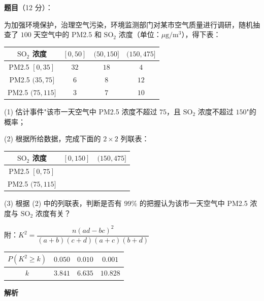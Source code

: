 \begin{answer}

\textbf{题目}（12 分）：

为加强环境保护，治理空气污染，环境监测部门对某市空气质量进行调研，随机抽查了 $100$ 天空气中的 PM2.5 和 $\mathrm{SO_2}$ 浓度（单位：$\mu\mathrm g/\mathrm m^{3}$），得下表：

\begin{center}
\begin{tabular}{cccc}
\toprule
$\mathrm{SO_2}$ 浓度 & $[0,50]$ & $(50,150]$ & $(150,475]$ \\
\midrule
PM2.5 $[0,35]$ & $32$ & $18$ & $4$ \\
PM2.5 $(35,75]$ & $6$ & $8$ & $12$ \\
PM2.5 $(75,115]$ & $3$ & $7$ & $10$ \\
\bottomrule
\end{tabular}
\end{center}

  (1) 估计事件"该市一天空气中 PM2.5 浓度不超过 $75$，且 $\mathrm{SO_2}$ 浓度不超过 $150$"的概率；

  (2) 根据所给数据，完成下面的 $2\times2$ 列联表：

\begin{center}
\begin{tabular}{ccc}
\toprule
$\mathrm{SO_2}$ 浓度 & $[0,150]$ & $(150,475]$ \\
\midrule
PM2.5 $[0,75]$ &  &  \\
PM2.5 $(75,115]$ &  &  \\
\bottomrule
\end{tabular}
\end{center}

  (3) 根据 (2) 中的列联表，判断是否有 $99\%$ 的把握认为该市一天空气中 PM2.5 浓度与 $\mathrm{SO_2}$ 浓度有关？

  附：$K^{2}=\dfrac{n(ad-bc)^{2}}{(a+b)(c+d)(a+c)(b+d)}$

\begin{center}
\begin{tabular}{cccc}
\toprule
$P\left(K^{2}\ge k\right)$ & $0.050$ & $0.010$ & $0.001$ \\
\midrule
$k$ & $3.841$ & $6.635$ & $10.828$ \\
\bottomrule
\end{tabular}
\end{center}

\textbf{解析}


\end{answer}
